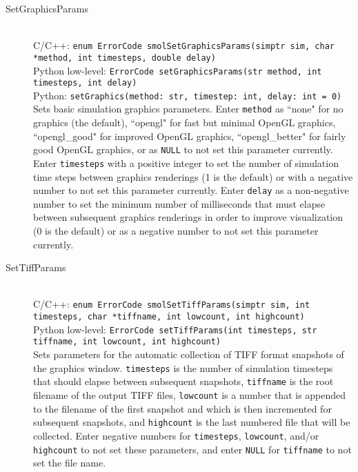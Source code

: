 \documentclass {book}
\newcommand {\ttt} {\texttt}
\begin{document}
\begin{description}

\item[SetGraphicsParams]
\hfill \\
C/C++: \ttt{enum ErrorCode smolSetGraphicsParams(simptr sim, char *method, int timesteps, double delay)}\\
Python low-level: \ttt{ErrorCode setGraphicsParams(str method, int timesteps, int delay)}\\
Python: \ttt{setGraphics(method: str, timestep: int, delay: int = 0)}\\
Sets basic simulation graphics parameters. Enter \ttt{method} as ``none" for no graphics (the default), ``opengl" for fast but minimal OpenGL graphics, ``opengl\_good" for improved OpenGL graphics, ``opengl\_better" for fairly good OpenGL graphics, or as \ttt{NULL} to not set this parameter currently. Enter \ttt{timesteps} with a positive integer to set the number of simulation time steps between graphics renderings (1 is the default) or with a negative number to not set this parameter currently. Enter \ttt{delay} as a non-negative number to set the minimum number of milliseconds that must elapse between subsequent graphics renderings in order to improve visualization (0 is the default) or as a negative number to not set this parameter currently.

\item[SetTiffParams]
\hfill \\
C/C++: \ttt{enum ErrorCode smolSetTiffParams(simptr sim, int timesteps, char *tiffname, int lowcount, int highcount)}\\
Python low-level: \ttt{ErrorCode setTiffParams(int timesteps, str tiffname, int lowcount, int highcount)}\\
Sets parameters for the automatic collection of TIFF format snapshots of the graphics window. \ttt{timesteps} is the number of simulation timesteps that should elapse between subsequent snapshots, \ttt{tiffname} is the root filename of the output TIFF files, \ttt{lowcount} is a number that is appended to the filename of the first snapshot and which is then incremented for subsequent snapshots, and \ttt{highcount} is the last numbered file that will be collected. Enter negative numbers for \ttt{timesteps}, \ttt{lowcount}, and/or \ttt{highcount} to not set these parameters, and enter \ttt{NULL} for \ttt{tiffname} to not set the file name.


\end{description}
\end{document}
